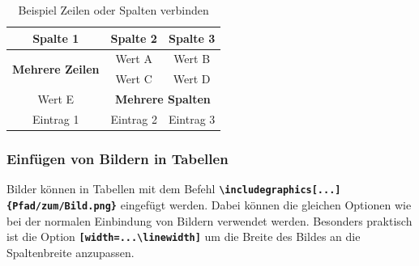 \begin{table}[H]
    \centering
    \renewcommand{\arraystretch}{1.5}
    \begin{tabular}{|c|c|c|}
        \hline
        \textbf{Spalte 1}                        & \textbf{Spalte 2}                             & \textbf{Spalte 3} \\
        \hline
        \multirow{2}{*}{\textbf{Mehrere Zeilen}} & Wert A                                        & Wert B            \\
                                                 & Wert C                                        & Wert D            \\
        \hline
        Wert E                                   & \multicolumn{2}{c|}{\textbf{Mehrere Spalten}}                     \\
        \hline
        Eintrag 1                                & Eintrag 2                                     & Eintrag 3         \\
        \hline
    \end{tabular}
    \caption{Beispiel Zeilen oder Spalten verbinden}
    \label{tab:example_multirow_multicolumn}
\end{table}


\subsubsection{Einfügen von Bildern in Tabellen}
Bilder können in Tabellen mit dem Befehl \textbf{\texttt{\textbackslash includegraphics[...]\{Pfad/zum/Bild.png\}}} eingefügt werden. Dabei können die gleichen Optionen wie bei der normalen Einbindung von Bildern verwendet werden. Besonders praktisch ist die Option \textbf{\texttt{[width=...\textbackslash linewidth]}} um die Breite des Bildes an die Spaltenbreite anzupassen.

